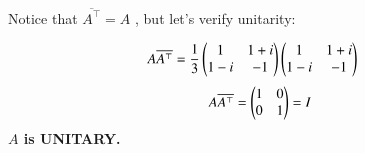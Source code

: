 \documentclass[journal]{IEEEtran}
\begin{document}
Notice that $\overline{A^\top} = A$ , but let's verify unitarity:

\begin{align}
	A\overline{A^\top} &= \frac{1}{3}\begin{pmatrix}1 & 1+i \\ 1-i & -1\end{pmatrix}\begin{pmatrix}1 & 1+i \\ 1-i & -1\end{pmatrix}
\end{align}
\begin{equation}
	A\overline{A^\top} = \begin{pmatrix}1 & 0 \\ 0 & 1\end{pmatrix} = I
\end{equation}
\textbf{$A$ is UNITARY.}\\
	
	
	
	
	
\end{document}
